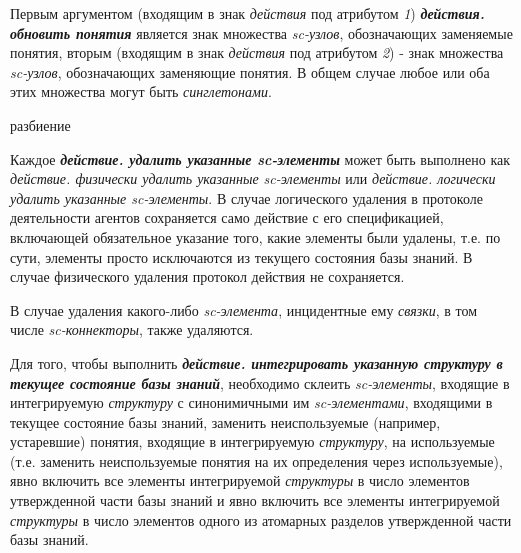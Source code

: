 Первым аргументом (входящим в знак \textit{действия} под атрибутом \textit{1\scnrolesign}) \textbf{\textit{действия. обновить понятия}} является знак множества \textit{sc-узлов}, обозначающих заменяемые понятия, вторым (входящим в знак \textit{действия} под атрибутом \textit{2\scnrolesign}) - знак множества \textit{sc-узлов}, обозначающих заменяющие понятия. В общем случае любое или оба этих множества могут быть \textit{синглетонами}.

\begin{SCn}
\begin{scnrelfromset}{разбиение}
\end{scnrelfromset}
\end{SCn}

Каждое \textbf{\textit{действие. удалить указанные sc-элементы}} может быть выполнено как \textit{действие. физически удалить указанные sc-элементы} или \textit{действие. логически удалить указанные sc-элементы}. В случае логического удаления в протоколе деятельности агентов сохраняется само действие с его спецификацией, включающей обязательное указание того, какие элементы были удалены, т.е. по сути, элементы просто исключаются из текущего состояния базы знаний. В случае физического удаления протокол действия не сохраняется.
	
В случае удаления какого-либо \textit{sc-элемента}, инцидентные ему \textit{связки}, в том числе \textit{sc-коннекторы}, также удаляются.

Для того, чтобы выполнить \textbf{\textit{действие. интегрировать указанную структуру в текущее состояние базы знаний}}, необходимо склеить \textit{sc-элементы}, входящие в интегрируемую \textit{структуру} с синонимичными им \textit{sc-элементами}, входящими в текущее состояние базы знаний, заменить неиспользуемые (например, устаревшие) понятия, входящие в интегрируемую \textit{структуру}, на используемые (т.е. заменить неиспользуемые понятия на их определения через используемые), явно включить все элементы интегрируемой \textit{структуры} в число элементов утвержденной части базы знаний и явно включить все элементы интегрируемой \textit{структуры} в число элементов одного из атомарных разделов утвержденной части базы знаний.

\begin{SCn}
\end{SCn}

